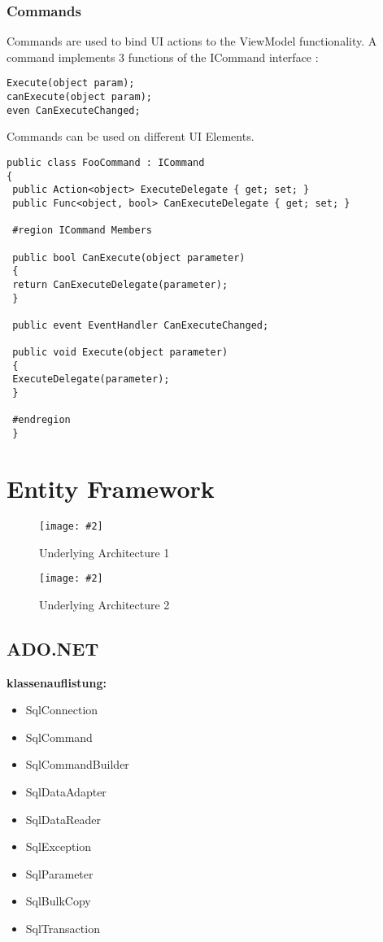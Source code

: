 \documentclass[a4paper,10pt]{scrreprt}
\newcommand{\pic}[2][figure]{\begin{figure}[h]
 \centering
 \texttt{[image: \#2]}
 \caption{#1}
\end{figure}
}
\begin{document}
\subsection{Commands}
Commands are used to bind UI actions to the ViewModel functionality. A command implements 3 functions of the ICommand interface : 
\begin{verbatim}
Execute(object param);
canExecute(object param);
even CanExecuteChanged;
\end{verbatim}

Commands can be used on different UI Elements.

\begin{lstlisting}[caption = ICommand Implementation Example]
public class FooCommand : ICommand
{
 public Action<object> ExecuteDelegate { get; set; }
 public Func<object, bool> CanExecuteDelegate { get; set; }

 #region ICommand Members

 public bool CanExecute(object parameter)
 {
 return CanExecuteDelegate(parameter);
 }

 public event EventHandler CanExecuteChanged;

 public void Execute(object parameter)
 {
 ExecuteDelegate(parameter);
 }

 #endregion
 }
\end{lstlisting}

\chapter{Entity Framework}
\pic[Underlying Architecture 1]{ula.png}

\pic[Underlying Architecture 2]{ula_2.png}

\section{ADO.NET}
\textbf{klassenauflistung:}
\begin{itemize}
\item SqlConnection
\item SqlCommand
\item SqlCommandBuilder
\item SqlDataAdapter
\item SqlDataReader
\item SqlException
\item SqlParameter
\item SqlBulkCopy
\item SqlTransaction
\end{itemize}
\end{document}
